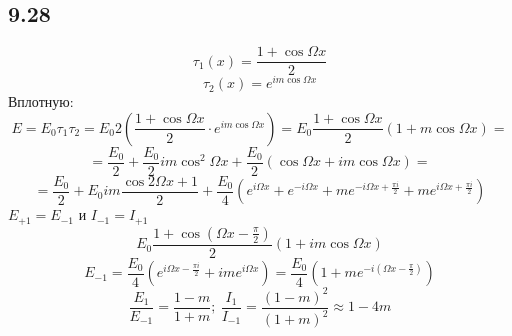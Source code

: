 \subsection*{9.28}
$$\tau_1 (x) = \frac{1 + \cos \Omega x}{2}$$
$$\tau_2 (x) = e^{i m \cos \Omega x}$$
Вплотную:
$$E = E_0 \tau_1 \tau_2 = E_0 2 (\frac{1 + \cos \Omega x}{2} \cdot e^{i m \cos \Omega x}) = E_0  \frac{1 + \cos \Omega x}{2} (1 + m\cos \Omega x) =$$
$$= \frac{E_0}{2} + \frac{E_0}{2} i m \cos^2 \Omega x + \frac{E_0}{2}(\cos \Omega x + im \cos \Omega x) = $$
$$= \frac{E_0}{2} + E_0 im  \frac{\cos 2 \Omega x + 1}{2} + \frac{E_0}{4} (e^{i \Omega x} + e^{-i \Omega x} + m e^{-i \Omega x + \frac{\pi i}{2}} + me^{i \Omega x + \frac{\pi i}{2}}) $$
$E_{+1} = E_{-1}$ и $I_{-1} = I_{+1}$\\
$$E_0  \frac{1 + \cos (\Omega x - \frac{\pi}{2})}{2} (1 + im\cos \Omega x)$$
$$E_{-1} = \frac{E_0}{4} (e^{i \Omega x - \frac{\pi i }{2}} + im e^{i \Omega x}) = \frac{E_0}{4} (1 + m e^{-i (\Omega x - \frac{\pi}{2})})$$
$$\frac{E_1}{E_{-1}} = \frac{1-m}{1+m}; \  \frac{I_1}{I_{-1}} = \frac{(1-m)^2}{(1+m)^2} \approx 1 - 4m $$